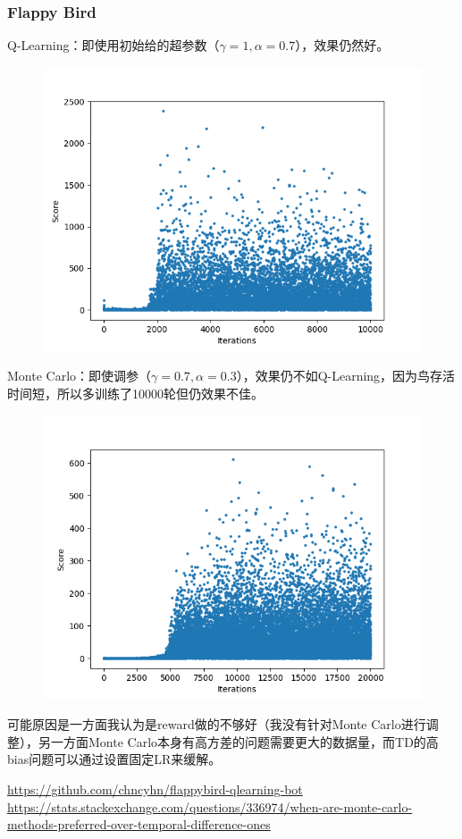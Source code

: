 \documentclass[a4paper, 11pt]{article}
\begin{document}
\subsubsection{Flappy Bird}
Q-Learning：即使用初始给的超参数（$\gamma=1,\alpha=0.7$），效果仍然好。
\begin{figure}[H]
\centering
\includegraphics[width=16cm]{Pic/q_learning_1_0.7_10000.png}
\end{figure}
Monte Carlo：即使调参（$\gamma=0.7,\alpha=0.3$），效果仍不如Q-Learning，因为鸟存活时间短，所以多训练了10000轮但仍效果不佳。
\begin{figure}[H]
\centering
\includegraphics[width=16cm]{Pic/monte_carlo_0.7_0.3_20000.png}
\end{figure}
可能原因是一方面我认为是reward做的不够好（我没有针对Monte Carlo进行调整），另一方面Monte Carlo本身有高方差的问题需要更大的数据量，而TD的高bias问题可以通过设置固定LR来缓解\cite{ref2}。
%
%
\begin{thebibliography}{99}
       \url{https://github.com/chncyhn/flappybird-qlearning-bot}
       \url{https://stats.stackexchange.com/questions/336974/when-are-monte-carlo-methods-preferred-over-temporal-difference-ones}
\end{thebibliography}
\end{document}
